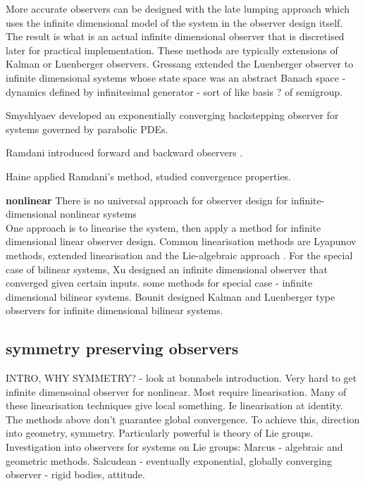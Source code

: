More accurate observers can be designed with the late lumping approach which uses the infinite dimensional model of the system in the observer design itself. The result is what is an actual infinite dimensional observer that is discretised later for practical implementation. These methods are typically extensions of Kalman or Luenberger observers. 
Gressang \cite{gressang1975observers} extended the Luenberger observer to infinite dimensional systems whose state space was an abstract Banach space - dynamics defined by infinitesimal generator - sort of like basis ? of semigroup.

Smyshlyaev \cite{smyshlyaev2005backstepping} developed an exponentially converging backstepping observer for systems governed by parabolic PDEs.

Ramdani introduced forward and backward observers \cite{ramdani2010recovering}.

Haine \cite{haine2014recovering} applied Ramdani's method, studied convergence properties.

\textbf{nonlinear}
There is no universal approach for observer design for infinite-dimensional nonlinear systems\\
One approach is to linearise the system, then apply a method for infinite dimensional linear observer design. Common linearisation methods are Lyapunov methods, extended linearisation and the Lie-algebraic approach \cite{primbs1996survey}.
For the special case of bilinear systems, Xu \cite{xu1995observer} designed an infinite dimensional observer that converged given certain inputs. some methods for special case - infinite dimensional bilinear systems. Bounit \cite{bounit1997observers} designed Kalman and Luenberger type observers for infinite dimensional bilinear systems. 

\subsection{symmetry preserving observers}
INTRO, WHY SYMMETRY? - look at bonnabels introduction. Very hard to get infinite dimensoinal observer for nonlinear. Most require linearisation. Many of these linearisation techniques give local something. Ie linearisation at identity. The methods above don't guarantee global convergence. To achieve this, direction into geometry, symmetry. Particularly powerful is theory of Lie groups.
Investigation into observers for systems on Lie groups:
Marcus \cite{marcus1984algebraic} - algebraic and geometric methods.
Salcudean - eventually exponential, globally converging observer - rigid bodies, attitude.

